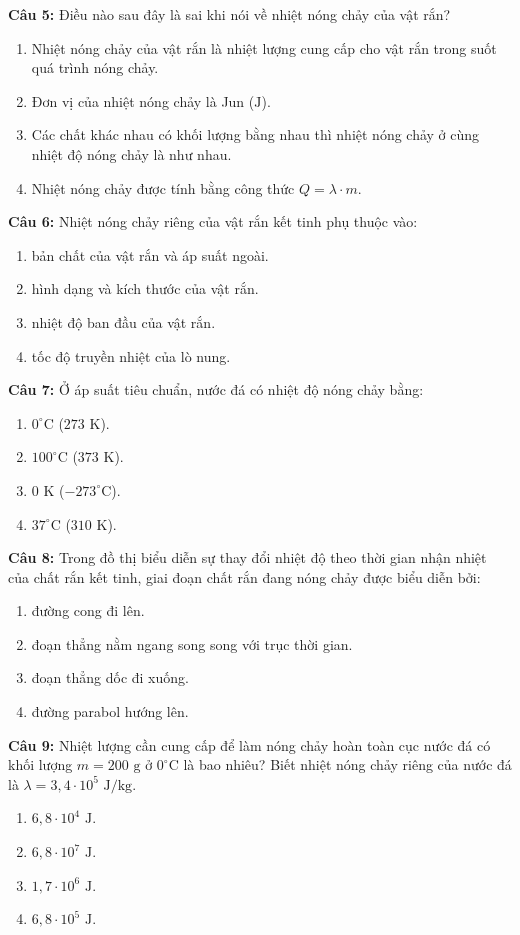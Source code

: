 \documentclass[12pt,a4paper]{article}
\begin{document}
\textbf{Câu 5:} Điều nào sau đây là sai khi nói về nhiệt nóng chảy của vật rắn?
\begin{enumerate}[label=\Alph*.]
  \item Nhiệt nóng chảy của vật rắn là nhiệt lượng cung cấp cho vật rắn trong suốt quá trình nóng chảy.
  \item Đơn vị của nhiệt nóng chảy là Jun ($\text{J}$).
  \item Các chất khác nhau có khối lượng bằng nhau thì nhiệt nóng chảy ở cùng nhiệt độ nóng chảy là như nhau.
  \item Nhiệt nóng chảy được tính bằng công thức $Q = \lambda \cdot m$.
\end{enumerate}

\textbf{Câu 6:} Nhiệt nóng chảy riêng của vật rắn kết tinh phụ thuộc vào:
\begin{enumerate}[label=\Alph*.]
  \item bản chất của vật rắn và áp suất ngoài.
  \item hình dạng và kích thước của vật rắn.
  \item nhiệt độ ban đầu của vật rắn.
  \item tốc độ truyền nhiệt của lò nung.
\end{enumerate}

\textbf{Câu 7:} Ở áp suất tiêu chuẩn, nước đá có nhiệt độ nóng chảy bằng:
\begin{enumerate}[label=\Alph*.]
  \item $0^{\circ}\text{C}$ ($273\text{ K}$).
  \item $100^{\circ}\text{C}$ ($373\text{ K}$).
  \item $0\text{ K}$ ($-273^{\circ}\text{C}$).
  \item $37^{\circ}\text{C}$ ($310\text{ K}$).
\end{enumerate}

\textbf{Câu 8:} Trong đồ thị biểu diễn sự thay đổi nhiệt độ theo thời gian nhận nhiệt của chất rắn kết tinh, giai đoạn chất rắn đang nóng chảy được biểu diễn bởi:
\begin{enumerate}[label=\Alph*.]
  \item đường cong đi lên.
  \item đoạn thẳng nằm ngang song song với trục thời gian.
  \item đoạn thẳng dốc đi xuống.
  \item đường parabol hướng lên.
\end{enumerate}

\textbf{Câu 9:} Nhiệt lượng cần cung cấp để làm nóng chảy hoàn toàn cục nước đá có khối lượng $m = 200\text{ g}$ ở $0^{\circ}\text{C}$ là bao nhiêu? Biết nhiệt nóng chảy riêng của nước đá là $\lambda = 3{,}4 \cdot 10^5\text{ J/kg}$.
\begin{enumerate}[label=\Alph*.]
  \item $6{,}8 \cdot 10^4\text{ J}$.
  \item $6{,}8 \cdot 10^7\text{ J}$.
  \item $1{,}7 \cdot 10^6\text{ J}$.
  \item $6{,}8 \cdot 10^5\text{ J}$.
\end{enumerate}
\end{document}
